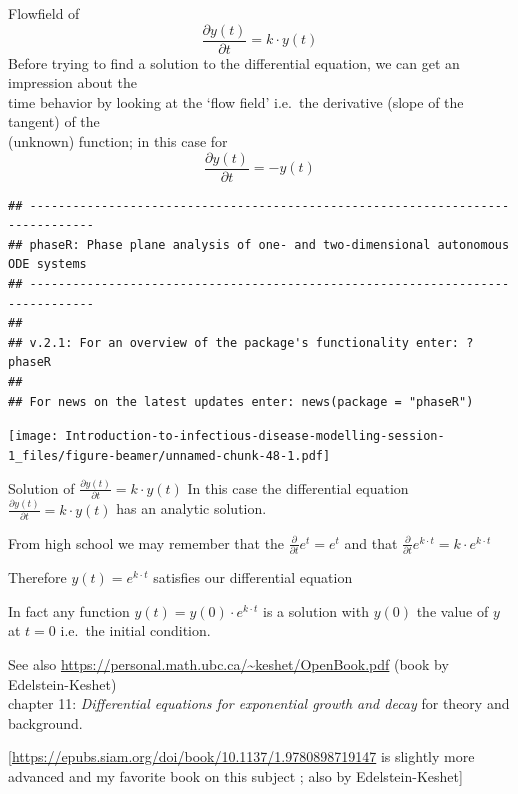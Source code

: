 \documentclass[
  ignorenonframetext,
]{beamer}
\begin{document}
\begin{frame}[fragile]{Flowfield of
\[\frac {\partial y(t)} {\partial t} = k \cdot y(t)\]}
\protect\hypertarget{flowfield-of-frac-partial-yt-partial-t-k-cdot-yt}{}
Before trying to find a solution to the differential equation, we can
get an impression about the\\
time behavior by looking at the `flow field' i.e.~the derivative (slope
of the tangent) of the\\
(unknown) function; in this case for
\[\frac {\partial y(t)}{\partial t} = - y(t)\]

\begin{verbatim}
## -------------------------------------------------------------------------------
## phaseR: Phase plane analysis of one- and two-dimensional autonomous ODE systems
## -------------------------------------------------------------------------------
## 
## v.2.1: For an overview of the package's functionality enter: ?phaseR
## 
## For news on the latest updates enter: news(package = "phaseR")
\end{verbatim}

\texttt{[image: Introduction-to-infectious-disease-modelling-session-1\_files/figure-beamer/unnamed-chunk-48-1.pdf]}
\end{frame}

\begin{frame}{Solution of
\(\frac {\partial y(t)}{\partial t} = k \cdot y(t)\)}
\protect\hypertarget{solution-of-frac-partial-ytpartial-t-k-cdot-yt}{}
In this case the differential equation
\(\frac{\partial y(t)}{\partial t} = k \cdot y(t)\) has an analytic
solution.

From high school we may remember that the
\(\frac{\partial }{\partial t}e^t = e^t\) and that
\(\frac{\partial }{\partial t}e^{k \cdot t} = k \cdot e^{k \cdot t}\)

Therefore \(y(t) = e^{k \cdot t}\) satisfies our differential equation

In fact any function \(y(t) = y(0) \cdot e^{k \cdot t}\) is a solution
with \(y(0)\) the value of \(y\) at \(t=0\) i.e.~the initial condition.

See also \url{https://personal.math.ubc.ca/~keshet/OpenBook.pdf} (book
by Edelstein-Keshet)\\
chapter 11: \emph{Differential equations for exponential growth and
decay} for theory and background.

{[}\url{https://epubs.siam.org/doi/book/10.1137/1.9780898719147} is
slightly more advanced and my favorite book on this subject ; also by
Edelstein-Keshet{]}
\end{frame}
\end{document}
